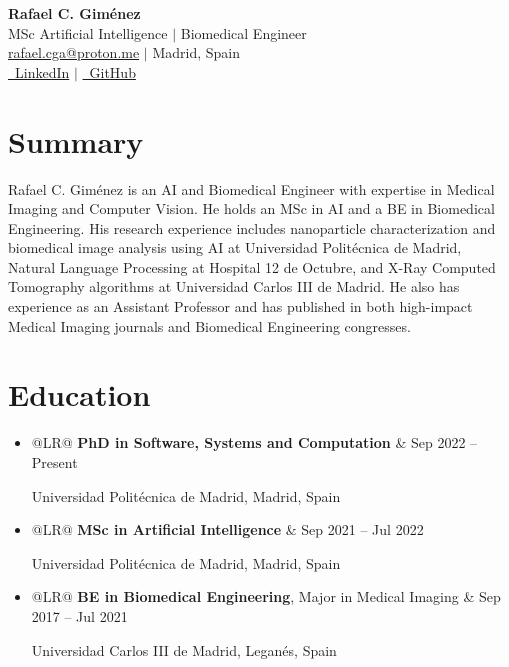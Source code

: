 \documentclass[letterpaper,10pt]{article}
\makeatletter
\newcommand{\dateitem}[2]{
    \item
    \noindent
    \begin{tabularx}{\linewidth}{@{}LR@{}}
        #1 & #2 \\
    \end{tabularx}
    \par
}
\makeatother
\begin{document}
\begin{center}
    \vspace{-1cm} %
    \color{headerblue}
    {\Huge \bfseries Rafael C. Giménez} \\
    \vspace{5pt}
    \normalsize
    MSc Artificial Intelligence $|$ Biomedical Engineer \\
    \vspace{5pt}
    \color{textgray}
    \href{mailto:rafael.cga@proton.me}{rafael.cga@proton.me} $|$ Madrid, Spain \\
    \vspace{3pt}
    \href{https://www.linkedin.com/in/rafaelcga/}{\faLinkedin\ LinkedIn} $|$ \href{https://github.com/rafaelcga}{\faGithub\ GitHub} \\
\end{center}
\vspace{10pt} %

\section*{Summary}
\vspace{5pt}
\color{textgray}
Rafael C. Giménez is an AI and Biomedical Engineer with expertise in Medical Imaging and Computer Vision. He holds an MSc in AI and a BE in Biomedical Engineering. His research experience includes nanoparticle characterization and biomedical image analysis using AI at Universidad Politécnica de Madrid, Natural Language Processing at Hospital 12 de Octubre, and X-Ray Computed Tomography algorithms at Universidad Carlos III de Madrid. He also has experience as an Assistant Professor and has published in both high-impact Medical Imaging journals and Biomedical Engineering congresses.

\section*{Education}
\vspace{5pt}
\color{textgray}
\begin{itemize}
    \dateitem{\textbf{PhD in Software, Systems and Computation}}{Sep 2022 -- Present}
        Universidad Politécnica de Madrid, Madrid, Spain
    \dateitem{\textbf{MSc in Artificial Intelligence}}{Sep 2021 -- Jul 2022}
        Universidad Politécnica de Madrid, Madrid, Spain
    \dateitem{\textbf{BE in Biomedical Engineering}, Major in Medical Imaging}{Sep 2017 -- Jul 2021}
        Universidad Carlos III de Madrid, Leganés, Spain
\end{itemize}
\end{document}
